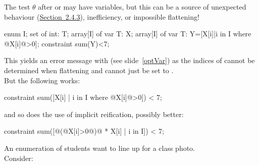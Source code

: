 \documentclass{cons-beamer}
\begin{document}
\begin{flashcardminizinc}
\begin{frame}[fragile]
  \alert{The test $\theta$ after  or 
    may have variables, but this can be a source of unexpected
    behaviour
    (\href{https://www.minizinc.org/doc-latest/en/optiontypes.html}{Section~2.4.3}),
    inefficiency, or impossible flattening!}  \vfill
  
  \begin{example}
    \vspace{-3mm}
    \footnotesize
    \begin{mzn}
enum I; set of int: T; array[I] of var T: X;
array[I] of var T: Y=[X[i]|i in I where @X[i]@>0]; constraint sum(Y)<7;
    \end{mzn}\normalsize
    \vspace{-1mm} This yields an error message with  (see slide~\ref{optVar}) as the indices of 
    cannot be determined when flattening and cannot just be set to
    . \\
    But the following works:

    \footnotesize
    \vspace{-1mm}
    \begin{mzn}[firstnumber=2]
constraint sum([X[i] | i in I where @X[i]@>0]) < 7;
    \end{mzn}\normalsize
    \vspace{-1mm}
    and so does the use of implicit reification, possibly better:

    \footnotesize
    \vspace{-1mm}
    \begin{mzn}[firstnumber=2]
constraint sum([@(@X[i]>0@)@ * X[i] | i in I]) < 7;
    \end{mzn}
    \vspace{-1mm}
  \end{example}
\end{frame}

\begin{frame}[fragile]
  \begin{example}
    An enumeration  of students want to line up
    for a class photo. \\[+5pt]

    Consider: \\
    \footnotesize
    ~~~~\invisible{\alert{\texttt{~~~~~~~~~~~}}} \\ \normalsize


\end{example}
\end{frame}
\end{flashcardminizinc}
\end{document}

